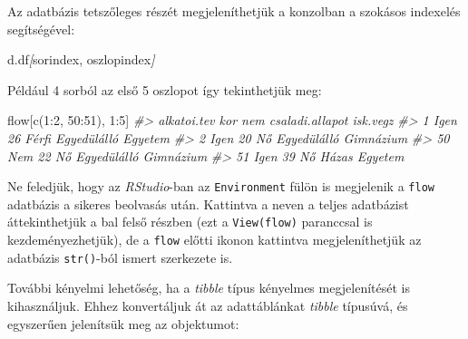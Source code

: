 \documentclass[
]{book}
\newenvironment{Shaded}{\begin{snugshade}}{\end{snugshade}}
\newcommand{\CommentTok}[1]{\textcolor[rgb]{0.56,0.35,0.01}{\textit{#1}}}
\newcommand{\DecValTok}[1]{\textcolor[rgb]{0.00,0.00,0.81}{#1}}
\newcommand{\FunctionTok}[1]{\textcolor[rgb]{0.00,0.00,0.00}{#1}}
\newcommand{\NormalTok}[1]{#1}
\newcommand{\OtherTok}[1]{\textcolor[rgb]{0.56,0.35,0.01}{#1}}
\newcommand{\SpecialCharTok}[1]{\textcolor[rgb]{0.00,0.00,0.00}{#1}}
\begin{document}
Az adatbázis tetszőleges részét megjeleníthetjük a konzolban a szokásos indexelés segítségével:

\begin{Shaded}
\begin{Highlighting}[]
\NormalTok{d.df}\CommentTok{[}\OtherTok{sorindex, oszlopindex}\CommentTok{]}
\end{Highlighting}
\end{Shaded}

Például 4 sorból az első 5 oszlopot így tekinthetjük meg:

\begin{Shaded}
\begin{Highlighting}[]
\NormalTok{flow[}\FunctionTok{c}\NormalTok{(}\DecValTok{1}\SpecialCharTok{:}\DecValTok{2}\NormalTok{, }\DecValTok{50}\SpecialCharTok{:}\DecValTok{51}\NormalTok{), }\DecValTok{1}\SpecialCharTok{:}\DecValTok{5}\NormalTok{]}
\CommentTok{\#\textgreater{}    alkatoi.tev kor   nem csaladi.allapot  isk.vegz}
\CommentTok{\#\textgreater{} 1         Igen  26 Férfi     Egyedülálló   Egyetem}
\CommentTok{\#\textgreater{} 2         Igen  20    Nő     Egyedülálló Gimnázium}
\CommentTok{\#\textgreater{} 50         Nem  22    Nő     Egyedülálló Gimnázium}
\CommentTok{\#\textgreater{} 51        Igen  39    Nő           Házas   Egyetem}
\end{Highlighting}
\end{Shaded}

Ne feledjük, hogy az \emph{RStudio}-ban az \texttt{Environment} fülön is megjelenik a \texttt{flow} adatbázis a sikeres beolvasás után. Kattintva a neven a teljes adatbázist áttekinthetjük a bal felső részben (ezt a \texttt{View(flow)} paranccsal is kezdeményezhetjük), de a \texttt{flow} előtti ikonon kattintva megjeleníthetjük az adatbázis \texttt{str()}-ból ismert szerkezete is.

További kényelmi lehetőség, ha a \emph{tibble} típus kényelmes megjelenítését is kihasználjuk. Ehhez konvertáljuk át az adattáblánkat \emph{tibble} típusúvá, és egyszerűen jelenítsük meg az objektumot:
\end{document}
